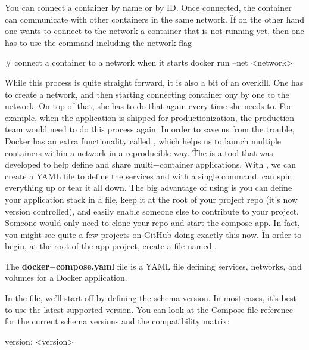 You can connect a container by name or by ID. Once connected, the container can communicate with other containers in
the same network. \v

If on the other hand one wants to connect to the network a container that is not running yet, then one has to use the
 command including the network  flag

\begin{bash}
# connect a container to a network when it starts
docker run --net <network>
\end{bash}

While this process is quite straight forward, it is also a bit of an overkill. One has to create a network, and then
starting connecting container ony by one to the network. On top of that, she has to do that again every time she
needs to. For example, when the application is shipped for productionization, the production team would need to do
this process again. In order to save us from the trouble, Docker has an extra functionality called , which helps us to launch multiple containers within a network in a reproducible way. \v

The  is a tool that was developed to help define and share multi$-$container applications. With
, we can create a YAML file to define the services and with a single command, can spin
everything up or tear it all down. The big advantage of using  is you can define your
application stack in a file, keep it at the root of your project repo (it's now version controlled), and easily
enable someone else to contribute to your project. Someone would only need to clone your repo and start the compose
app. In fact, you might see quite a few projects on GitHub doing exactly this now. \v

In order to begin, at the root of the app project, create a file named .

The \textbf{docker$-$compose.yaml} file is a YAML file defining services, networks, and volumes for a Docker
application.
\ed

In the  file, we'll start off by defining the schema version. In most cases, it's best to
use the latest supported version. You can look at the Compose file reference for the current schema versions and the
compatibility matrix:

\begin{block}
version: <version>
\end{block}

